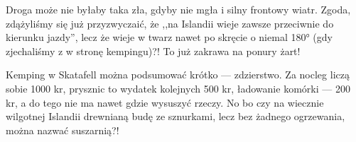 Droga może nie byłaby taka zła, gdyby nie mgła i silny frontowy wiatr. Zgoda, zdążyliśmy się już przyzwyczaić, że ,,na Islandii wieje zawsze przeciwnie do kierunku jazdy'', lecz że wieje w twarz nawet po skręcie o niemal 180° (gdy zjechaliśmy z  w stronę kempingu)?! To już zakrawa na ponury żart!


Kemping w Skatafell można podsumować krótko --- zdzierstwo. Za nocleg liczą sobie 1000 kr, prysznic to wydatek kolejnych 500 kr, ładowanie komórki --- 200 kr, a do tego nie ma nawet gdzie wysuszyć rzeczy. No bo czy na wiecznie wilgotnej Islandii drewnianą budę ze sznurkami, lecz bez żadnego ogrzewania, można nazwać suszarnią?!
